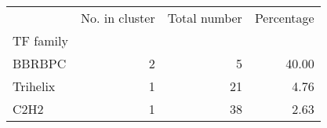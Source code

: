 \begin{tabular}{lrrr}
\toprule
{} &  No. in cluster &  Total number &  Percentage \\
TF family &                 &               &             \\
\midrule
BBRBPC    &               2 &             5 &       40.00 \\
Trihelix  &               1 &            21 &        4.76 \\
C2H2      &               1 &            38 &        2.63 \\
\bottomrule
\end{tabular}
